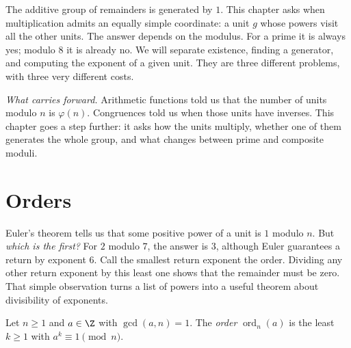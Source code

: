 \begin{reminder}
The additive group of remainders is generated by $1$. This chapter asks when
multiplication admits an equally simple coordinate: a unit $g$ whose powers
visit all the other units. The answer depends on the modulus. For a prime it is
always yes; modulo $8$ it is already no. We will separate existence, finding a
generator, and computing the exponent of a given unit. They are three different
problems, with three very different costs.
\end{reminder}

\noindent\emph{What carries forward.} Arithmetic functions told us that the number of units modulo $n$ is $\varphi(n)$. Congruences told us when those units have inverses. This chapter goes a step further: it asks how the units multiply, whether one of them generates the whole group, and what changes between prime and composite moduli.

\section{Orders}

Euler's theorem tells us that some positive power of a unit is $1$ modulo $n$. But \emph{which is the first?} For $2$ modulo $7$, the answer is $3$, although Euler guarantees a return by exponent $6$. Call the smallest return exponent the order. Dividing any other return exponent by this least one shows that the remainder must be zero. That simple observation turns a list of powers into a useful theorem about divisibility of exponents.

\begin{definition}
Let $n\ge1$ and $a\in\Z$ with $\gcd(a,n)=1$. The \emph{order} $\operatorname{ord}_n(a)$ is the least $k\ge1$ with $a^k\equiv1\pmod n$.
\end{definition}

